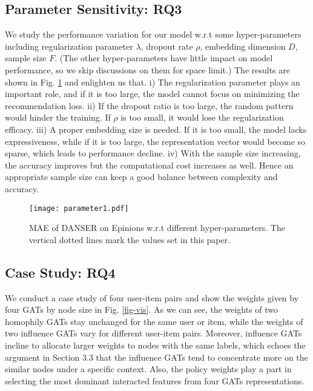 \documentclass[sigconf]{acmart}
\begin{document}
\subsection{Parameter Sensitivity: RQ3}

We study the performance variation for our model w.r.t some hyper-parameters including regularization parameter $\lambda$, dropout rate $\rho$, embedding dimension $D$, sample size $F$. (The other hyper-parameters have little impact on model performance, so we skip discussions on them for space limit.) The results are shown in Fig. \ref{fig-parameter} and enlighten us that. i) The regularization parameter plays an important role, and if it is too large, the model cannot focus on minimizing the recommendation loss. ii) If the dropout ratio is too large, the random pattern would hinder the training. If $\rho$ is too small, it would lose the regularization efficacy. iii) A proper embedding size is needed. If it is too small, the model lacks expressiveness, while if it is too large, the representation vector would become so sparse, which leads to performance decline. iv) With the sample size increasing, the accuracy improves but the computational cost increases as well. Hence an appropriate sample size can keep a good balance between complexity and accuracy.

\begin{figure}[h]
	\centering
	\vspace{-5pt}
	\texttt{[image: parameter1.pdf]}
	\vspace{-10pt}
	\caption{MAE of DANSER on Epinions w.r.t different hyper-parameters. The vertical dotted lines mark the values set in this paper.}
	\label{fig-parameter}
	\vspace{-10pt}
\end{figure}

\subsection{Case Study: RQ4}

We conduct a case study of four user-item pairs and show the weights given by four GATs by node size in Fig. \ref{fig-vis}. As we can see, the weights of two homophily GATs stay unchanged for the same user or item, while the weights of two influence GATs vary for different user-item pairs. Moreover, influence GATs incline to allocate larger weights to nodes with the same labels, which echoes the argument in Section 3.3 that the influence GATs tend to concentrate more on the similar nodes under a specific context. Also, the policy weights play a part in selecting the most dominant interacted features from four GATs representations. 
\end{document}
